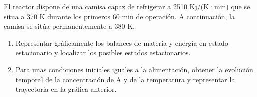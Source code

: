 \documentclass{report}
\begin{document}
\begin{raggedright}
{El reactor dispone de una camisa capaz de refrigerar a 2510 Kj/(K·min) que se situa a 370 K durante los primeros 60 min de operación. A continuación, la camisa se sitúa permanentemente a 380 K.


\begin{enumerate}[label=\bfseries\scriptsize\protect\circled{\footnotesize\Alph*}]
	\item Representar gráficamente los balances de materia y energía en estado estacionario y localizar los posibles estados estacionarios.
	\item Para unas condiciones iniciales iguales a la alimentación, obtener la evolución temporal de la concentración de A y de la temperatura y representar la trayectoria en la gráfica anterior.
\end{enumerate}}

\end{raggedright}



\end{document}
